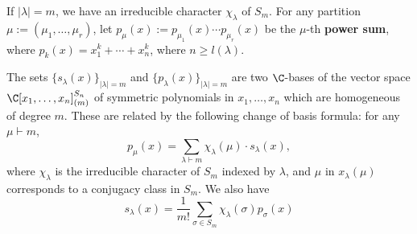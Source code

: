 \begin{defn}
    If $|\lambda|=m$, we have an irreducible character $\chi_\lambda$ of $S_m$. For any partition $\mu:= (\mu_1,\dots,\mu_r)$, let $p_\mu(x) := p_{\mu_1}(x) \cdots p_{\mu _r}(x)$ be the $\mu$-th \textbf{power sum}, where $p_k(x) = x_1^k+\cdots + x_n^k$, where $n \geq l(\lambda)$.
\end{defn}

\begin{thm}
    The sets $\{s_\lambda (x)\}_{|\lambda|=m}$ and $\{ p_\lambda(x)\}_{|\lambda|=m}$ are two $\C$-bases of the vector space $\C[x_1,\dots,x_n]^{S_n}_{(m)}$ of symmetric polynomials in $x_1,\dots,x_n$ which are homogeneous of degree $m$. These are related by the following change of basis formula: for any $\mu \vdash m$,
    $$p_\mu(x) = \sum_{\lambda \vdash m}\chi_\lambda (\mu) \cdot s_\lambda(x),$$
    where $\chi_\lambda$ is the irreducible character of $S_m$ indexed by $\lambda$, and $\mu$ in $x_\lambda(\mu)$ corresponds to a conjugacy class in $S_m$. We also have
    $$s_\lambda (x) = \frac{1}{m!}\sum_{\sigma \in S_m}\chi_\lambda ( \sigma) p_{\sigma}(x)$$
\end{thm}
